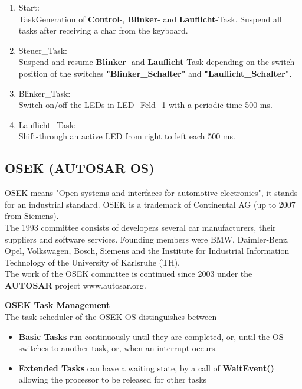 \begin{enumerate}
\item  Start:\\TaskGeneration of \textbf{Control}-, \textbf{Blinker}- and \textbf{Lauflicht}-Task. Suspend all tasks after receiving a char from the keyboard.

\item  Steuer\_Task:\\Suspend and resume \textbf{Blinker}- and \textbf{Lauflicht}-Task depending on the switch position of the switches \textbf{"Blinker\_Schalter"} and \textbf{"Lauflicht\_Schalter"}.

\item  Blinker\_Task:\\Switch on/off the LEDs in LED\_Feld\_1 with a periodic time 500 ms.

\item  Lauflicht\_Task:\\Shift-through an active LED from right to left each 500 ms.
\end{enumerate}

\subsection{OSEK (AUTOSAR OS)}

OSEK means "Open systems and interfaces for automotive electronics", it stands for an industrial standard. OSEK is a trademark of Continental AG (up to 2007 from Siemens).\\

The 1993 committee consists of developers several car manufacturers, their suppliers and software services. Founding members were BMW, Daimler-Benz, Opel, Volkswagen, Bosch, Siemens and the Institute for Industrial Information Technology of the University of Karlsruhe (TH). \\

The work of the OSEK committee is continued since 2003 under the \textbf{AUTOSAR} project www.autosar.org\textit{.}\\
\os{\newpage}

{\rot\bf OSEK Task Management}\\

The task-scheduler of the OSEK OS distinguishes between

\begin{itemize}
\item  \textbf{Basic Tasks} run continuously until they are completed, or, until the OS switches to another task, or, when an interrupt occurs.

\item  \textbf{Extended Tasks} can have a waiting state, by a call of \textbf{WaitEvent()} allowing the processor to be released for other tasks
\end{itemize}
    
